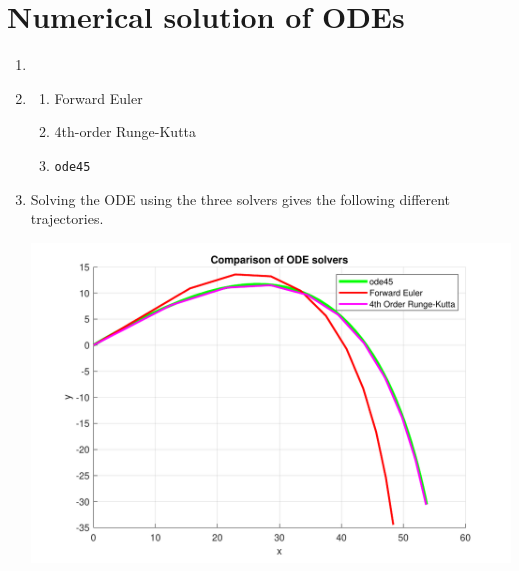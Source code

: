 \documentclass[a4paper,11pt]{article}
\begin{document}
\section{Numerical solution of ODEs}
\begin{enumerate}
	\item 
	
	
	\item\begin{enumerate}
		\item Forward Euler
		
		\item 4th-order Runge-Kutta
		
		\item \verb*|ode45|
		
	\end{enumerate}


	\item Solving the ODE using the three solvers gives the 
	following different trajectories.
	\begin{center}
		\includegraphics[scale=0.7]{images/Q3c.pdf}
	\end{center}


\end{enumerate}
\end{document}
